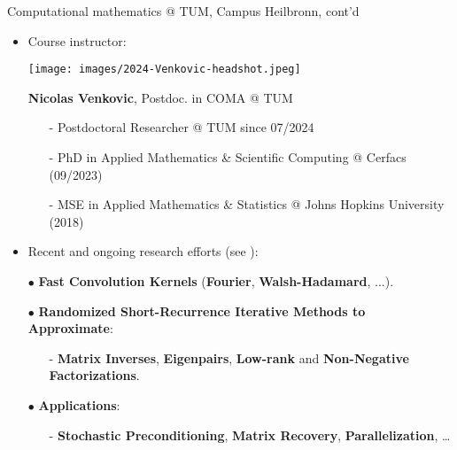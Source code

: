 \documentclass[t,usepdftitle=false]{beamer}
\begin{document}
\begin{frame}{Computational mathematics @ TUM, Campus Heilbronn, cont'd}
\begin{itemize}
\item Course instructor:\vspace{-.2cm}
\begin{center}\texttt{[image: images/2024-Venkovic-headshot.jpeg]}\end{center}\vspace{.15cm}
\textbf{Nicolas Venkovic}, Postdoc. in COMA @ TUM%
\begin{itemize}
\item[-] Postdoctoral Researcher @ TUM since 07/2024\vspace{.05cm}
\item[-] PhD in Applied Mathematics \& Scientific Computing @ Cerfacs (09/2023)\vspace{.05cm}
\item[-] MSE in Applied Mathematics \& Statistics @ Johns Hopkins University (2018)\vspace{.05cm}
\end{itemize}
\item Recent and ongoing research efforts (see \href{https://venkovic.github.io/research}{}):
\item[$\bullet$] \textbf{Fast Convolution Kernels} (\textbf{Fourier}, \textbf{Walsh-Hadamard}, ...).
\item[$\bullet$] \textbf{Randomized Short-Recurrence Iterative Methods to Approximate}:\\
\begin{itemize}\normalsize
\item[-] \textbf{Matrix Inverses}, \textbf{Eigenpairs}, \textbf{Low-rank} and \textbf{Non-Negative Factorizations}.\vspace{.05cm}
\end{itemize}
\item[$\bullet$] \textbf{Applications}:
\begin{itemize}\normalsize
\item[-] \textbf{Stochastic Preconditioning}, \textbf{Matrix Recovery}, \textbf{Parallelization}, \dots
\end{itemize}
\end{itemize}
\end{frame}
\end{document}
